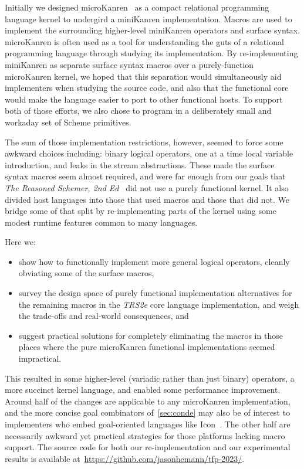 \documentclass[sigplan,balance=true,pbalance=true,natbib=false]{acmart}
\begin{document}
Initially we designed microKanren~\cite{hemann2013muKanren} as a
compact relational programming language kernel to undergird a
miniKanren implementation. Macros are used to implement the
surrounding higher-level miniKanren operators and surface syntax.\@
microKanren is often used as a tool for understanding the guts of a
relational programming language through studying its implementation.
By re-implementing miniKanren as separate surface syntax macros over a
purely-function microKanren kernel, we hoped that this separation
would simultaneously aid implementers when studying the source code,
and also that the functional core would make the language easier to
port to other functional hosts. To support both of those efforts, we
also chose to program in a deliberately small and workaday set of
Scheme primitives.

The sum of those implementation restrictions, however, seemed to force
some awkward choices including: binary logical operators, one at a
time local variable introduction, and leaks in the stream
abstractions. These made the surface syntax macros seem almost
required, and were far enough from our goals that \emph{The Reasoned
  Schemer, 2nd Ed}~\cite{friedman2018reasoned} did not use a purely
functional kernel. It also divided host languages into those that used
macros and those that did not. We bridge some of that split by
re-implementing parts of the kernel using some modest runtime features
common to many languages.

Here we:
%
\begin{itemize}

\item show how to functionally implement more general logical
  operators, cleanly obviating some of the surface macros,

\item survey the design space of purely functional implementation
  alternatives for the remaining macros in the \emph{TRS2e} core
  language implementation, and weigh the trade-offs and real-world
  consequences, and

\item suggest practical solutions for completely eliminating the
  macros in those places where the pure microKanren functional
  implementations seemed impractical.

\end{itemize}

This resulted in some higher-level (variadic rather than just binary)
operators, a more succinct kernel language, and enabled some
performance improvement. Around half of the changes are applicable to
any microKanren implementation, and the more concise goal combinators
of~\cref{sec:conde} may also be of interest to implementers who embed
goal-oriented languages like Icon~\cite{griswold1983icon}. The other
half are necessarily awkward yet practical strategies for those
platforms lacking macro support. The source code for both our
re-implementation and  our experimental results is available
at~\url{https://github.com/jasonhemann/tfp-2023/}.
\end{document}
